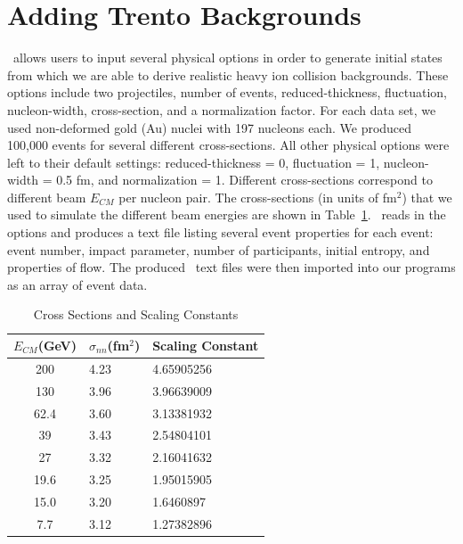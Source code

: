 \documentclass[11pt]{article}
\begin{document}
\section{Adding Trento Backgrounds}
%
%
\trento\ allows users to input several physical options in order to generate initial states from which we are able to derive realistic heavy ion collision backgrounds. These options include two projectiles, number of events, reduced-thickness, fluctuation, nucleon-width, cross-section, and a normalization factor. For each data set,  we used non-deformed gold (Au) nuclei with 197 nucleons each. We produced 100,000 events for several different cross-sections. All other physical options were left to their default settings: reduced-thickness = 0, fluctuation = 1, nucleon-width = 0.5 fm, and normalization = 1. Different cross-sections correspond to different beam $E_{CM}$ per nucleon pair. The cross-sections (in units of fm$^2$) that we used to simulate the different beam energies are shown in Table~\ref{tab_phenix_trento}. \trento\ reads in the options and produces a text file listing several event properties for each event: event number, impact parameter, number of participants, initial entropy, and properties of flow. The produced \trento\ text files were then imported into our programs as an array of event data.
%
\begin{table}[th]
\begin{center}
\caption{Cross Sections and Scaling Constants}
\label{tab_phenix_trento}
\begin{tabular}{|c|l|l|}
\hline
$E_{CM}$(GeV) & $\sigma_{nn}$(fm$^2$) & Scaling Constant \\
\hline
200 & 4.23 & 4.65905256 \\
\hline
130 & 3.96 & 3.96639009 \\
\hline
62.4 & 3.60 & 3.13381932 \\
\hline
39 & 3.43 & 2.54804101 \\
\hline
27 & 3.32 & 2.16041632 \\
\hline
19.6 & 3.25 & 1.95015905 \\
\hline
15.0 & 3.20 & 1.6460897 \\
\hline
7.7 & 3.12 & 1.27382896 \\
\hline
\end{tabular}
\end{center}
\end{table}
\end{document}
